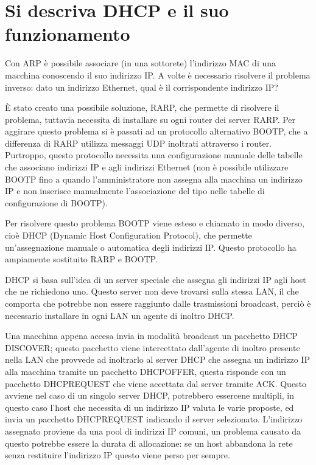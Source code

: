 \section{Si descriva DHCP e il suo funzionamento}

Con ARP è possibile associare (in una sottorete) l’indirizzo MAC di una macchina conoscendo il suo indirizzo IP.
A volte è necessario risolvere il problema inverso: dato un indirizzo Ethernet, qual è il corrispondente indirizzo IP?

È stato creato una possibile soluzione, RARP, che permette di risolvere il problema, tuttavia necessita di installare su ogni router dei server RARP. Per aggirare questo problema si è passati ad un protocollo alternativo BOOTP, che a differenza di RARP utilizza messaggi UDP inoltrati attraverso i router. Purtroppo, questo protocollo necessita una configurazione manuale delle tabelle che associano indirizzi IP e agli indirizzi Ethernet (non è possibile utilizzare BOOTP fino a quando l’amministratore non assegna alla macchina un indirizzo IP e non inserisce manualmente l’associazione del tipo nelle tabelle di configurazione di BOOTP).

Per risolvere questo problema BOOTP viene esteso e chiamato in modo diverso, cioè DHCP (Dynamic Host Configuration Protocol), che permette un’assegnazione manuale o automatica degli indirizzi IP.
Questo protocollo ha ampiamente sostituito RARP e BOOTP.

DHCP si basa sull’idea di un server speciale che assegna gli indirizzi IP agli host che ne richiedono uno.
Questo server non deve trovarsi sulla stessa LAN, il che comporta che potrebbe non essere raggiunto dalle trasmissioni broadcast, perciò è necessario installare in ogni LAN un agente di inoltro DHCP.

Una macchina appena accesa invia in modalità broadcast un pacchetto DHCP DISCOVER; questo pacchetto viene intercettato dall’agente di inoltro presente nella LAN che provvede ad inoltrarlo al server DHCP che assegna un indirizzo IP alla macchina tramite un pacchetto DHCPOFFER, questa risponde con un pacchetto DHCPREQUEST che viene accettata dal server tramite ACK.
Questo avviene nel caso di un singolo server DHCP, potrebbero essercene multipli, in questo caso l’host che necessita di un indirizzo IP valuta le varie proposte, ed invia un pacchetto DHCPREQUEST indicando il server selezionato.
L’indirizzo assegnato proviene da una pool di indirizzi IP comuni, un problema causato da questo potrebbe essere la durata di allocazione: se un host abbandona la rete senza restituire l’indirizzo IP questo viene perso per sempre.

